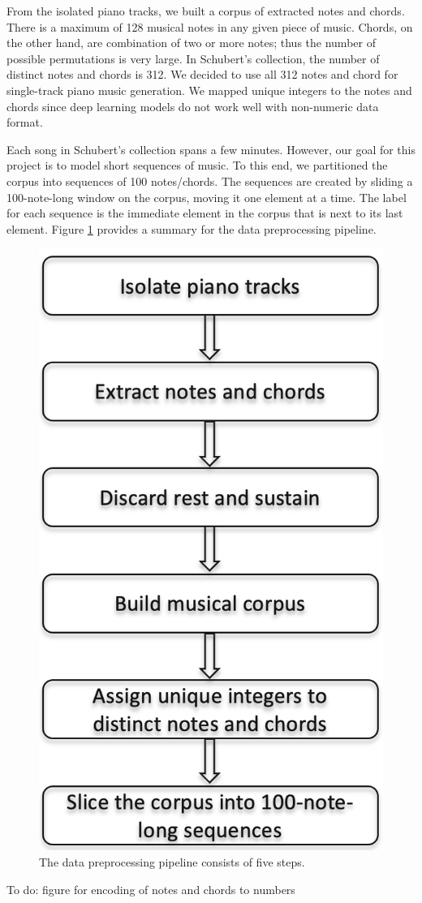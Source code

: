 \documentclass[sigconf,authorversion]{acmart}
\begin{document}
From the isolated piano tracks, we built a corpus of extracted notes and chords. 
There is a maximum of 128 musical notes in any given piece of music. Chords, on the 
other hand, are combination of two or more notes; thus the number of possible permutations 
is very large. In Schubert's collection, the number of distinct notes and chords is 312. 
We decided to use all 312 notes and chord for single-track
piano music generation. We mapped unique integers to the notes and chords since deep 
learning models do not work well with non-numeric data format.

Each song in Schubert's collection spans a few minutes. However, our goal for this 
project is to model short sequences of music. To this end, we partitioned the corpus
into sequences of 100 notes/chords. The sequences are created by sliding a 100-note-long
window on the corpus, moving it one element at a time. The label for each sequence is 
the immediate element in the corpus that is next to its last element. 
Figure \ref{preprocessing} provides a summary for the data preprocessing pipeline.

\begin{figure}[h]
  \centering
  \includegraphics[width=0.5\linewidth]{preprocess.png}
  \caption{The data preprocessing pipeline consists of five steps.}
  \label{preprocessing}
\end{figure}

To do: figure for encoding of notes and chords to numbers
\end{document}
